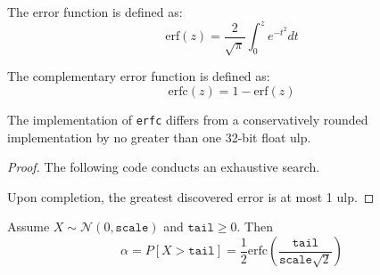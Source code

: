 \documentclass{article}
\begin{document}
\begin{definition}
    \label{erf}
    The error function is defined as:
    \begin{equation}
        \mathrm{erf}(z) = \frac{2}{\sqrt{\pi}} \int_{0}^{z} e^{-t^2} dt
    \end{equation}
\end{definition}

\begin{definition}
    \label{erfc}
    The complementary error function is defined as:
    \begin{equation}
        \mathrm{erfc}(z) = 1 - \mathrm{erf}(z)
    \end{equation}
\end{definition}

\begin{lemma}
    \label{erfc-err}
    The implementation of \texttt{erfc} differs from a conservatively rounded implementation by no greater than one 32-bit float ulp.
\end{lemma}

\begin{proof}
    The following code conducts an exhaustive search.
    \label{sec:erfc-err-check}
    

    Upon completion, the greatest discovered error is at most 1 ulp.
\end{proof}

\begin{lemma}\label{lem:tail-mass}
    Assume $X \sim \mathcal{N}(0, \texttt{scale})$ and $\texttt{tail} \ge 0$. Then
    \begin{equation}
        \alpha = P[X > \texttt{tail}] = \frac{1}{2} \mathrm{erfc}\left(\frac{\texttt{tail}}{\texttt{scale} \sqrt{2}}\right)
    \end{equation}
\end{lemma}
\end{document}
